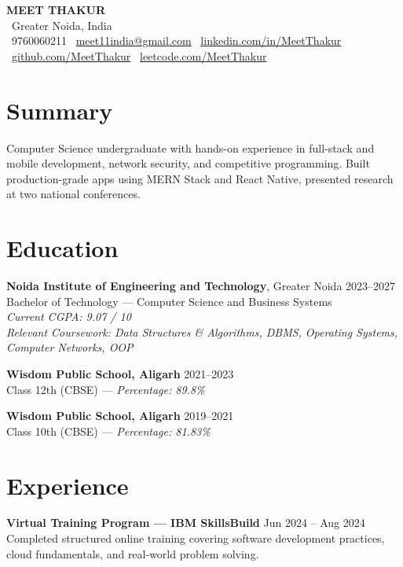 \documentclass[a4paper,10pt]{article}
\begin{document}
\begin{center}
    {\Huge \textbf{MEET THAKUR}}\\[2pt]
    {\small \faMapMarker\ Greater Noida, India}\\[3pt]
    \faPhone\ 9760060211 \quad
    \faEnvelope\ \href{mailto:meet11india@gmail.com}{meet11india@gmail.com} \quad
    \faLinkedin\ \href{https://linkedin.com/in/MeetThakur}{linkedin.com/in/MeetThakur} \\
    \faGithub\ \href{https://github.com/MeetThakur}{github.com/MeetThakur} \quad
    \faCode\ \href{https://leetcode.com/MeetThakur}{leetcode.com/MeetThakur}
\end{center}

\section*{Summary}
Computer Science undergraduate with hands-on experience in full-stack and mobile development, network security, and competitive programming. Built production-grade apps using MERN Stack and React Native, presented research at two national conferences.

\section*{Education}
\textbf{Noida Institute of Engineering and Technology}, Greater Noida \hfill 2023--2027 \\
Bachelor of Technology --- Computer Science and Business Systems \\
\textit{Current CGPA: 9.07 / 10} \\
\textit{Relevant Coursework: Data Structures \& Algorithms, DBMS, Operating Systems, Computer Networks, OOP}

\textbf{Wisdom Public School, Aligarh} \hfill 2021–2023 \\
Class 12th (CBSE) — \textit{Percentage: 89.8\%}

\textbf{Wisdom Public School, Aligarh} \hfill 2019–2021 \\
Class 10th (CBSE) — \textit{Percentage: 81.83\%}

\section*{Experience}
\textbf{Virtual Training Program — IBM SkillsBuild} \hfill Jun 2024 – Aug 2024 \\
Completed structured online training covering software development practices, cloud fundamentals, and real-world problem solving.
\end{document}
